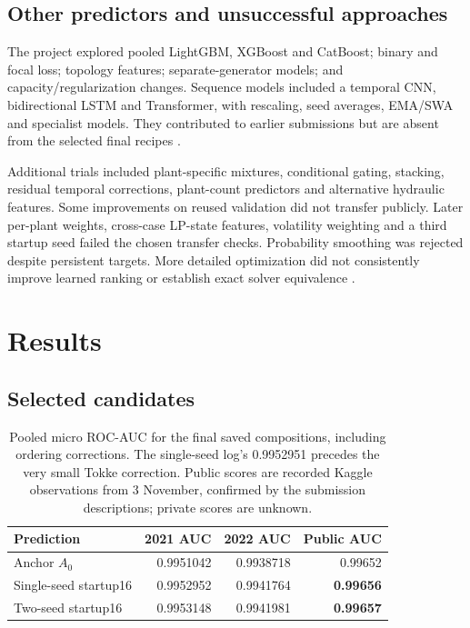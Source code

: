 \documentclass[a4paper,11pt]{article}
\begin{document}
\subsection*{Other predictors and unsuccessful approaches}
The project explored pooled LightGBM, XGBoost and CatBoost; binary and focal loss; topology features; separate-generator models; and capacity/regularization changes. Sequence models included a temporal CNN, bidirectional LSTM and Transformer, with rescaling, seed averages, EMA/SWA and specialist models. They contributed to earlier submissions but are absent from the selected final recipes \cite{history}.

Additional trials included plant-specific mixtures, conditional gating, stacking, residual temporal corrections, plant-count predictors and alternative hydraulic features. Some improvements on reused validation did not transfer publicly. Later per-plant weights, cross-case LP-state features, volatility weighting and a third startup seed failed the chosen transfer checks. Probability smoothing was rejected despite persistent targets. More detailed optimization did not consistently improve learned ranking or establish exact solver equivalence \cite{structure,supplied,history}.

\section{Results}
\subsection*{Selected candidates}
\begin{table}[ht]
\centering
\begin{tabular}{lrrr}
\hline
Prediction & 2021 AUC & 2022 AUC & Public AUC\\\hline
Anchor $A_0$ & 0.9951042 & 0.9938718 & 0.99652\\
Single-seed startup16 & 0.9952952 & 0.9941764 & \textbf{0.99656}\\
Two-seed startup16 & 0.9953148 & 0.9941981 & \textbf{0.99657}\\\hline
\end{tabular}
\caption{Pooled micro ROC-AUC for the final saved compositions, including ordering corrections. The single-seed log's 0.9952951 precedes the very small Tokke correction. Public scores are recorded Kaggle observations from 3 November, confirmed by the submission descriptions; private scores are unknown.}\label{results}
\end{table}
\end{document}

